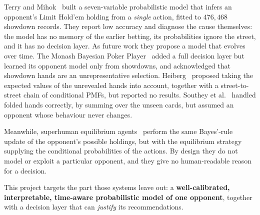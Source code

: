 \documentclass[11pt,a4paper]{article}
\newcommand{\1}{\mathbf{1}}
\begin{document}
Terry and Mihok~\cite{terry2005} built a seven-variable probabilistic model that
infers an opponent's Limit Hold'em holding from a \emph{single} action, fitted to
$476{,}468$ showdown records. They report low accuracy and diagnose the cause
themselves: the model has no memory of the earlier betting, its probabilities
ignore the street, and it has no decision layer. As future work they propose a
model that evolves over time. The Monash Bayesian Poker
Player~\cite{korb1999,nicholson2006} added a full decision layer but learned its
opponent model only from showdowns, and acknowledged that showdown hands are an
unrepresentative selection. Heiberg~\cite{heiberg2013} proposed taking the
expected values of the unrevealed hands into account, together with a
street-to-street chain of conditional PMFs, but reported no results. Southey et
al.~\cite{southey2005} handled folded hands correctly, by summing over the
unseen cards, but assumed an opponent whose behaviour never changes.

Meanwhile, superhuman equilibrium agents~\cite{bowling2015,moravcik2017,brown2018,brown2019,brown2020}
perform the same Bayes'-rule update of the opponent's possible holdings, but
with the equilibrium strategy supplying the conditional probabilities of the
actions. By design they do not model or exploit a particular opponent, and they
give no human-readable reason for a decision.

This project targets the part those systems leave out: a \textbf{well-calibrated,
interpretable, time-aware probabilistic model of one opponent}, together with a
decision layer that can \emph{justify} its recommendations.
\end{document}
